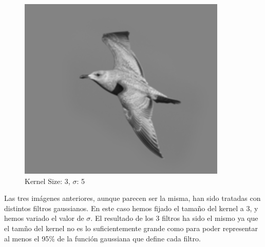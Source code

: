 \documentclass{article}
\begin{document}
\begin{minipage}{\linewidth}
    \begin{minipage}{0.45\linewidth}
        \begin{figure}[H]
            \includegraphics[width=\linewidth]{Ejercicio1a/gaussiana(3,3)5.png}
            \caption{Kernel Size: 3, $\sigma$: 5}
        \end{figure}
    \end{minipage}    
\end{minipage}
\linebreak
Las tres imágenes anteriores, aunque parecen ser la misma, han sido tratadas con distintos filtros gaussianos. En este caso hemos fijado el tamaño del kernel a 3, y hemos variado el valor de $\sigma$. El resultado de los 3 filtros ha sido el mismo ya que el tamño del kernel no es lo suficientemente grande como para poder representar al menos el 95\% de la función gaussiana que define cada filtro.
\end{document}
